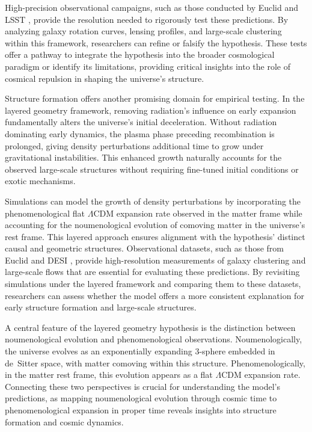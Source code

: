 \documentclass[aps,rmp,groupedaddress,twocolumn,10pt]{revtex4-2}
\begin{document}
High-precision observational campaigns, such as those conducted by Euclid and LSST \cite{Laureijs2012, Abell2009}, provide the resolution needed to rigorously test these predictions. By analyzing galaxy rotation curves, lensing profiles, and large-scale clustering within this framework, researchers can refine or falsify the hypothesis. These tests offer a pathway to integrate the hypothesis into the broader cosmological paradigm or identify its limitations, providing critical insights into the role of cosmical repulsion in shaping the universe's structure.

Structure formation offers another promising domain for empirical testing. In the layered geometry framework, removing radiation's influence on early expansion fundamentally alters the universe's initial deceleration. Without radiation dominating early dynamics, the plasma phase preceding recombination is prolonged, giving density perturbations additional time to grow under gravitational instabilities. This enhanced growth naturally accounts for the observed large-scale structures without requiring fine-tuned initial conditions or exotic mechanisms.

Simulations can model the growth of density perturbations by incorporating the phenomenological flat $\Lambda$CDM expansion rate observed in the matter frame while accounting for the noumenological evolution of comoving matter in the universe's rest frame. This layered approach ensures alignment with the hypothesis' distinct causal and geometric structures. Observational datasets, such as those from Euclid \cite{Laureijs2011} and DESI \cite{Aghamousa2016}, provide high-resolution measurements of galaxy clustering and large-scale flows that are essential for evaluating these predictions. By revisiting simulations under the layered framework and comparing them to these datasets, researchers can assess whether the model offers a more consistent explanation for early structure formation and large-scale structures.

A central feature of the layered geometry hypothesis is the distinction between noumenological evolution and phenomenological observations. Noumenologically, the universe evolves as an exponentially expanding 3-sphere embedded in de~Sitter space, with matter comoving within this structure. Phenomenologically, in the matter rest frame, this evolution appears as a flat $\Lambda$CDM expansion rate. Connecting these two perspectives is crucial for understanding the model's predictions, as mapping noumenological evolution through cosmic time to phenomenological expansion in proper time reveals insights into structure formation and cosmic dynamics.
\end{document}
